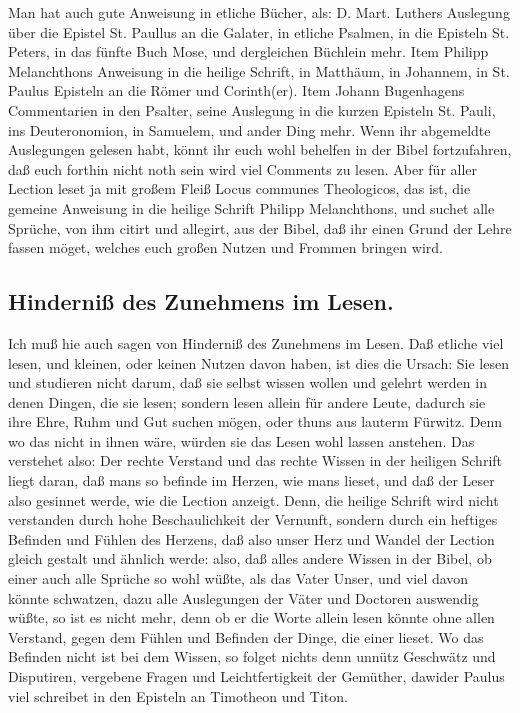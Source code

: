 Man hat auch gute Anweisung in etliche Bücher, als: D. Mart. Luthers Auslegung über die Epistel St. Paullus an die Galater, in etliche Psalmen, in die Episteln St. Peters, in das fünfte Buch Mose, und dergleichen Büchlein mehr. Item Philipp Melanchthons Anweisung in die heilige Schrift, in Matthäum, in Johannem, in St. Paulus Episteln an die Römer und Corinth(er). Item Johann Bugenhagens Commentarien in den Psalter, seine Auslegung in die kurzen Episteln St. Pauli, ins Deuteronomion, in Samuelem, und ander Ding mehr. Wenn ihr abgemeldte Auslegungen gelesen habt, könnt ihr euch wohl behelfen in der Bibel fortzufahren, daß euch forthin nicht noth sein wird viel Comments zu lesen. Aber für aller Lection leset ja mit großem Fleiß Locus communes Theologicos, das ist, die gemeine Anweisung in die heilige Schrift Philipp Melanchthons, und suchet alle Sprüche, von ihm citirt und allegirt, aus der Bibel, daß ihr einen Grund der Lehre fassen möget, welches euch großen Nutzen und Frommen bringen wird.

\subsection*{Hinderniß des Zunehmens im Lesen.}

Ich muß hie auch sagen von Hinderniß des Zunehmens im Lesen. Daß etliche viel lesen, und kleinen, oder keinen Nutzen davon haben, ist dies die Ursach: Sie lesen und studieren nicht darum, daß sie selbst wissen wollen und gelehrt werden in denen Dingen, die sie lesen; sondern lesen allein für andere Leute, dadurch sie ihre Ehre, Ruhm und Gut suchen mögen, oder thuns aus lauterm Fürwitz. Denn wo das nicht in ihnen wäre, würden sie das Lesen wohl lassen anstehen. Das verstehet also: Der rechte Verstand und das rechte Wissen in der heiligen Schrift liegt daran, daß mans so befinde im Herzen, wie mans lieset,
und daß der Leser also gesinnet werde, wie die Lection anzeigt. Denn, die heilige Schrift wird nicht verstanden durch hohe Beschaulichkeit der Vernunft, sondern durch ein heftiges Befinden und Fühlen des Herzens, daß also unser Herz und Wandel der Lection gleich gestalt und ähnlich werde: also, daß alles andere Wissen in der Bibel, ob einer auch alle Sprüche so wohl wüßte, als das Vater Unser, und viel davon könnte schwatzen, dazu alle Auslegungen der Väter und Doctoren auswendig wüßte, so ist es nicht mehr, denn ob er die Worte allein lesen könnte ohne allen Verstand, gegen dem Fühlen und Befinden der Dinge, die einer lieset. Wo das Befinden nicht ist bei dem Wissen, so folget nichts denn unnütz Geschwätz und Disputiren, vergebene Fragen und Leichtfertigkeit der Gemüther, dawider Paulus viel schreibet in den Episteln an Timotheon und Titon.


